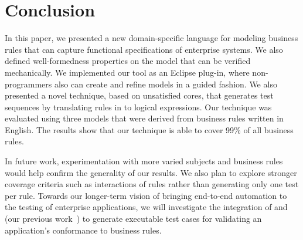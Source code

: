\section{Conclusion}

In this paper, we presented a new domain-specific language for modeling business
rules that can capture functional specifications of enterprise systems. We also
defined well-formedness properties on the model that can be verified
mechanically. We implemented our tool as an Eclipse plug-in, where
non-programmers also can create and refine models in a guided fashion. We also
presented a novel technique, based on unsatisfied cores, that generates test
sequences by translating rules in to logical expressions.
Our technique was evaluated using three models that were derived from business
rules written in English. The results show that our technique is able to cover
99\% of all business rules.

In future work, experimentation with more varied subjects and business rules
would help confirm the generality of our results. We also plan to explore
stronger coverage criteria such as interactions of rules rather than generating
only one test per rule. Towards our longer-term vision
of bringing end-to-end automation to the testing of enterprise applications, we
will investigate the integration of \tool{} and \wateg{} (our previous
work~\cite{Thummalapenta:2013}) to generate executable test cases for validating
an application's conformance to business rules.

